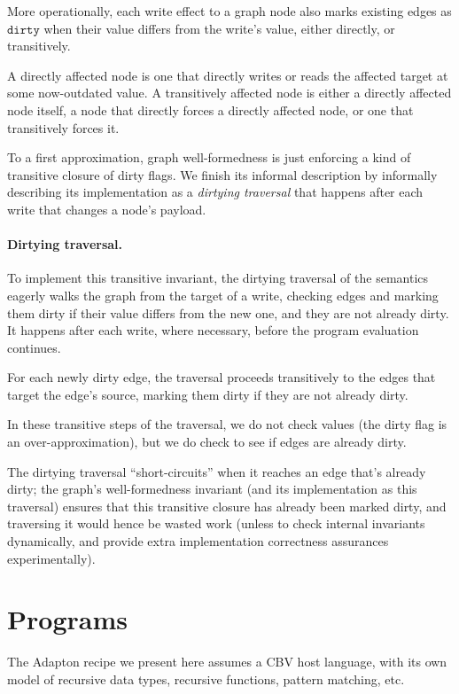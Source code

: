 \documentclass[11pt]{article}
\renewcommand{\ottkw}[1]{\mathtt{#1}}
\begin{document}
More operationally, each write effect to a graph node also marks
existing edges as $\ottkw{dirty}$ when their value differs from the write's
value, either directly, or transitively.

A directly affected node is one that directly writes or reads the
affected target at some now-outdated value.
%
A transitively affected node is either a directly affected node
itself, a node that directly forces a directly affected node, or one
that transitively forces it.

To a first approximation, graph well-formedness is just enforcing a
kind of transitive closure of dirty flags.
%
We finish its informal description by informally describing its
implementation as a \emph{dirtying traversal} that happens after each
write that changes a node's payload.

\paragraph{Dirtying traversal.}
To implement this transitive invariant, the dirtying traversal of the
semantics eagerly walks the graph from the target of a write, checking
edges and marking them dirty if their value differs from the new one,
and they are not already dirty.
%
It happens after each write, where necessary, before the program
evaluation continues.

For each newly dirty edge, the traversal proceeds transitively to the
edges that target the edge's source, marking them dirty if they are
not already dirty.

In these transitive steps of the traversal, we do not check values
(the dirty flag is an over-approximation), but we do check to see if
edges are already dirty.

The dirtying traversal ``short-circuits'' when it reaches an edge
that's already dirty; the graph's well-formedness invariant (and its
implementation as this traversal) ensures that this transitive closure
has already been marked dirty, and traversing it would hence be wasted
work (unless to check internal invariants dynamically, and provide
extra implementation correctness assurances experimentally).

\section{Programs}

The Adapton recipe we present here assumes a CBV host language, with
its own model of recursive data types, recursive functions, pattern
matching, etc.
\end{document}
